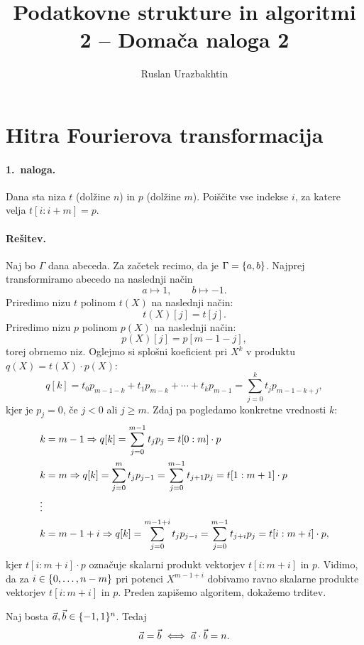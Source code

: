 \documentclass[11pt, a4paper]{article}
\begin{document}
\title{Podatkovne strukture in algoritmi 2 -- Domača naloga 2}
\author{Ruslan Urazbakhtin}
\maketitle

\newpage

\section*{Hitra Fourierova transformacija}
\paragraph{1.\ naloga.} Dana sta niza \(t\) (dolžine \(n\)) in \(p\) (dolžine \(m\)). Poiščite vse indekse \(i\), za katere velja \(t[i : i + m] = p\).
%
\paragraph{Rešitev.} Naj bo \(\Gamma\) dana abeceda. Za začetek recimo, da je \(\Gamma = \{a, b\}\). Najprej transformiramo abecedo na naslednji način
\[
    a \mapsto 1, \qquad b \mapsto -1.
\]
Priredimo nizu \(t\) polinom \(t(X)\) na naslednji način:
\[
    t(X)[j] = t[j].
\]
Priredimo nizu \(p\) polinom \(p(X)\) na naslednji način:
\[
    p(X)[j] = p[m - 1 - j],
\]
torej obrnemo niz. Oglejmo si splošni koeficient pri \(X^k\) v produktu \(q(X) = t(X) \cdot p(X)\):
\[
    q[k] = t_0p_{m-1-k} + t_1p_{m-k} + \cdots + t_kp_{m-1} = \sum_{j=0}^{k} t_j p_{m-1-k + j},
\]
kjer je \(p_j = 0\), če \(j < 0\) ali \(j \geq m\).
%
Zdaj pa pogledamo konkretne vrednosti \(k\):
%
\begin{align*}
    &k = m - 1 \Rightarrow q[k] = \sum_{j=0}^{m-1} t_jp_j = t[0 : m] \cdot p \\
    &k = m \Rightarrow q[k] = \sum_{j=0}^{m} t_j p_{j - 1} = \sum_{j=0}^{m-1} t_{j+1}p_j =  t[1 : m + 1] \cdot p\\
    &\vdots\\
    &k = m - 1 + i \Rightarrow q[k] = \sum_{j=0}^{m-1+i} t_j p_{j - i} = \sum_{j=0}^{m-1} t_{j+i}p_j =  t[i : m + i] \cdot p,
\end{align*}
kjer \(t[i : m + i] \cdot p\) označuje skalarni produkt vektorjev \(t[i : m + i]\) in \(p\). Vidimo, da za \(i \in \{0, \ldots, n - m\}\) pri potenci \(X^{m - 1 + i}\) dobivamo ravno skalarne produkte vektorjev \(t[i : m + i]\) in \(p\). Preden zapišemo algoritem, dokažemo trditev.

\begin{trditev}
    \label{proof-1}
    Naj bosta \(\vec{a}, \vec{b} \in \{-1, 1\}^n\). Tedaj 
    \[
        \vec{a} = \vec{b} \iff \vec{a} \cdot \vec{b} = n.
    \]
\end{trditev}
\end{document}
